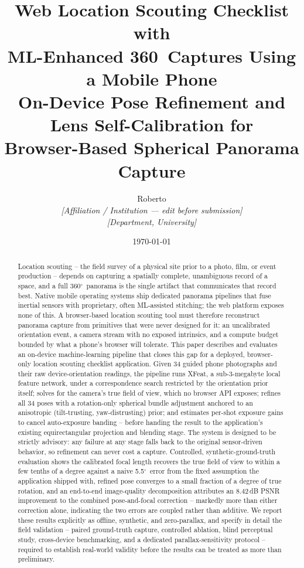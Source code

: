 \documentclass[11pt]{article}
\title{\textbf{Web Location Scouting Checklist with\\ ML-Enhanced 360\Deg\ Captures Using a Mobile Phone}\\[4pt]
\large On-Device Pose Refinement and Lens Self-Calibration for\\ Browser-Based Spherical Panorama Capture}
\author{%
  Roberto \\[2pt]
  \small \textit{[Affiliation / Institution --- edit before submission]} \\
  \small \textit{[Department, University]}
}
\date{\today}
\newcommand{\Deg}{\ensuremath{^{\circ}}}
\begin{document}
\maketitle

\begin{abstract}
Location scouting -- the field survey of a physical site prior to a photo, film, or event production -- depends on capturing a spatially complete, unambiguous record of a space, and a full 360\Deg\ panorama is the single artifact that communicates that record best. Native mobile operating systems ship dedicated panorama pipelines that fuse inertial sensors with proprietary, often ML-assisted stitching; the web platform exposes none of this. A browser-based location scouting tool must therefore reconstruct panorama capture from primitives that were never designed for it: an uncalibrated orientation event, a camera stream with no exposed intrinsics, and a compute budget bounded by what a phone's browser will tolerate. This paper describes and evaluates an on-device machine-learning pipeline that closes this gap for a deployed, browser-only location scouting checklist application. Given 34 guided phone photographs and their raw device-orientation readings, the pipeline runs XFeat, a sub-3-megabyte local feature network, under a correspondence search restricted by the orientation prior itself; solves for the camera's true field of view, which no browser API exposes; refines all 34 poses with a rotation-only spherical bundle adjustment anchored to an anisotropic (tilt-trusting, yaw-distrusting) prior; and estimates per-shot exposure gains to cancel auto-exposure banding -- before handing the result to the application's existing equirectangular projection and blending stage. The system is designed to be strictly advisory: any failure at any stage falls back to the original sensor-driven behavior, so refinement can never cost a capture. Controlled, synthetic-ground-truth evaluation shows the calibrated focal length recovers the true field of view to within a few tenths of a degree against a naive 5.5\Deg\ error from the fixed assumption the application shipped with, refined pose converges to a small fraction of a degree of true rotation, and an end-to-end image-quality decomposition attributes an 8.42\,dB PSNR improvement to the combined pose-and-focal correction -- markedly more than either correction alone, indicating the two errors are coupled rather than additive. We report these results explicitly as offline, synthetic, and zero-parallax, and specify in detail the field validation -- paired ground-truth capture, controlled ablation, blind perceptual study, cross-device benchmarking, and a dedicated parallax-sensitivity protocol -- required to establish real-world validity before the results can be treated as more than preliminary.
\end{abstract}
\end{document}
